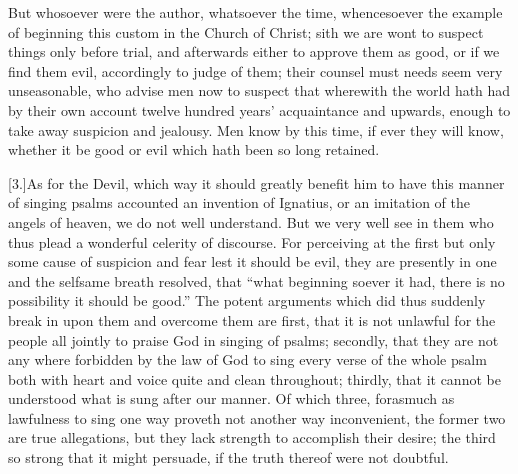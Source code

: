 But whosoever were the author, whatsoever the time, whencesoever the example of beginning this custom in the Church of Christ; sith we are wont to suspect things only before trial, and afterwards either to approve them as good, or if we find them evil, accordingly to judge of them; their counsel must needs seem very unseasonable, who advise men now to suspect that wherewith the world hath had by their own account twelve hundred years’ acquaintance and upwards, enough to take away suspicion and jealousy. Men know by this time, if ever they will know, whether it be good or evil which hath been so long retained.

[3.]As for the Devil, which way it should greatly benefit him to have this manner of singing psalms accounted an invention of Ignatius, or an imitation of the angels of heaven,  we do not well understand.
 But we very well see in them who thus plead a wonderful celerity of discourse. For perceiving at the first but only some cause of suspicion and fear lest it should be evil, they are presently in one and the selfsame breath resolved, that “what beginning soever it had, there is no possibility it should be good.” The potent arguments which did thus suddenly break in upon them and overcome them are first, that it is not unlawful for the people all jointly to praise God in singing of psalms; secondly, that they are not any where forbidden by the law of God to sing every verse of the whole psalm both with heart and voice quite and clean throughout; thirdly, that it cannot be understood what is sung after our manner. Of which three, forasmuch as lawfulness to sing one way proveth not another way inconvenient, the former two are true allegations, but they lack strength to accomplish their desire; the third so strong that it might persuade, if the truth thereof were not doubtful.

